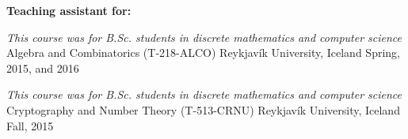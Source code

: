 \begin{cventries}

\begin{flushleft}
\textbf{Teaching assistant for:}
\end{flushleft}


\cventrypresentation
  {\textit{This course was for B.Sc. students in discrete mathematics and computer science}} %
  {Algebra and Combinatorics (T-218-ALCO)} %
  {Reykjavík University, Iceland} %
  {Spring, 2015, and 2016} %


\cventrypresentation
  {\textit{This course was for B.Sc. students in discrete mathematics and computer science}} %
  {Cryptography and Number Theory (T-513-CRNU)} %
  {Reykjavík University, Iceland} %
  {Fall, 2015} %


\end{cventries}
